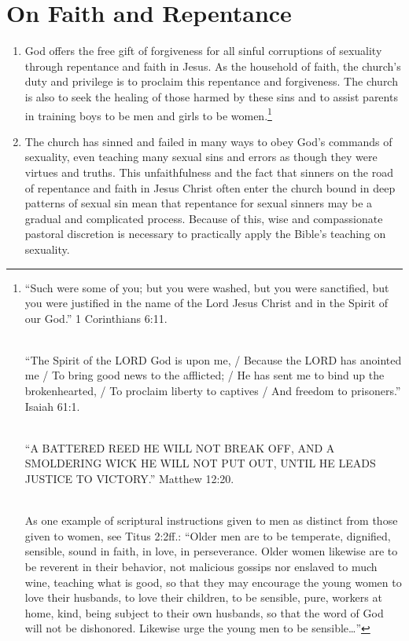 \documentclass[
]{book}
\begin{document}
\hypertarget{on-faith-and-repentance}{%
\section*{On Faith and Repentance}\label{on-faith-and-repentance}}

\begin{enumerate}
\def\labelenumi{\arabic{enumi}.}
\setcounter{enumi}{15}
\item
  God offers the free gift of forgiveness for all sinful corruptions of sexuality through repentance and faith in Jesus. As the household of faith, the church's duty and privilege is to proclaim this repentance and forgiveness. The church is also to seek the healing of those harmed by these sins and to assist parents in training boys to be men and girls to be women.\footnote{``Such were some of you; but you were washed, but you were sanctified, but you were justified in the name of the Lord Jesus Christ and in the Spirit of our God.'' 1 Corinthians 6:11.\\
    \strut \\
    ``The Spirit of the LORD God is upon me, / Because the LORD has anointed me / To bring good news to the afflicted; / He has sent me to bind up the brokenhearted, / To proclaim liberty to captives / And freedom to prisoners.'' Isaiah 61:1.\\
    \strut \\
    ``A BATTERED REED HE WILL NOT BREAK OFF, AND A SMOLDERING WICK HE WILL NOT PUT OUT, UNTIL HE LEADS JUSTICE TO VICTORY.'' Matthew 12:20.\\
    \strut \\
    As one example of scriptural instructions given to men as distinct from those given to women, see Titus 2:2ff.: ``Older men are to be temperate, dignified, sensible, sound in faith, in love, in perseverance. Older women likewise are to be reverent in their behavior, not malicious gossips nor enslaved to much wine, teaching what is good, so that they may encourage the young women to love their husbands, to love their children, to be sensible, pure, workers at home, kind, being subject to their own husbands, so that the word of God will not be dishonored. Likewise urge the young men to be sensible\ldots{}''}
\item
  The church has sinned and failed in many ways to obey God's commands of sexuality, even teaching many sexual sins and errors as though they were virtues and truths. This unfaithfulness and the fact that sinners on the road of repentance and faith in Jesus Christ often enter the church bound in deep patterns of sexual sin mean that repentance for sexual sinners may be a gradual and complicated process. Because of this, wise and compassionate pastoral discretion is necessary to practically apply the Bible's teaching on sexuality.
\end{enumerate}
\end{document}

